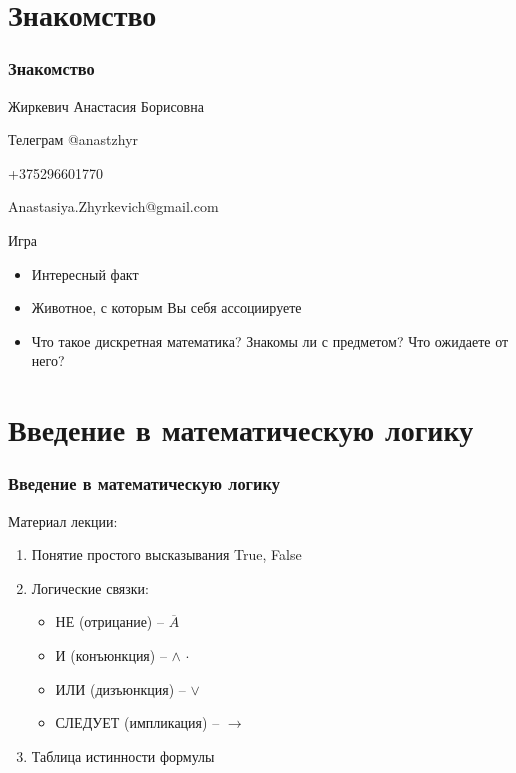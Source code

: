 \documentclass[10pt]{beamer}
\theoremstyle{remark}
\theoremstyle{definition}
\begin{document}
\section{Знакомство}
\begin{frame}[allowframebreaks]
\frametitle{Знакомство}

Жиркевич Анастасия Борисовна 

Телеграм @anastzhyr 

+375296601770

Anastasiya.Zhyrkevich@gmail.com

\framebreak 

Игра

\begin{itemize}
    \item Интересный факт 
    \item Животное, с которым Вы себя ассоциируете
    \item Что такое дискретная математика? Знакомы ли с предметом? Что ожидаете от него? 
\end{itemize}

\end{frame}


\section{Введение в математическую логику}
\begin{frame}[allowframebreaks]
\frametitle{Введение в математическую логику}

Материал лекции: 
\begin{enumerate}
    \item Понятие простого высказывания True, False
    \item Логические связки:
\begin{itemize}
    \item НЕ  (отрицание) -- $\overline{A}$
    \item И (конъюнкция) -- $\wedge$ $\cdot$
    \item ИЛИ (дизъюнкция) -- $\vee$
    \item СЛЕДУЕТ (импликация) -- $\to$
\end{itemize}
\item Таблица истинности формулы
\end{enumerate}

\end{frame}
\end{document}
